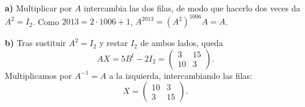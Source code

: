\textbf{a)} Multiplicar por $A$ intercambia las dos filas, de modo que hacerlo dos veces da $A^2=I_2$. Como $2013=2\cdot1006+1$, $A^{2013}=(A^2)^{1006}A=A$.

\textbf{b)} Tras sustituir $A^2=I_2$ y restar $I_2$ de ambos lados, queda
\[
AX=5B^t-2I_2=\begin{pmatrix}3&15\\10&3\end{pmatrix}.
\]
Multiplicamos por $A^{-1}=A$ a la izquierda, intercambiando las filas:
\[
X=\boxed{\begin{pmatrix}10&3\\3&15\end{pmatrix}}.
\]

